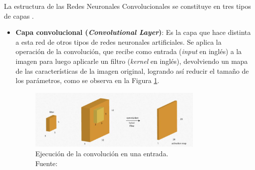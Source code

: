 \begin{itemize}
\begin{itemize}
		La estructura de las Redes Neuronales Convolucionales se constituye en tres tipos de capas \parencite{tec_lopez2016cnnTF}.
		\begin{itemize}
			\item \textbf{Capa convolucional (\textit{Convolutional Layer})}: Es la capa que hace distinta a esta red de otros tipos de redes neuronales artificiales. Se aplica la operación de la convolución, que recibe como entrada (\textit{input} en inglés) a la imagen para luego aplicarle un filtro (\textit{kernel} en inglés), devolviendo un mapa de las características de la imagen original, logrando así reducir el tamaño de los parámetros, como se observa en la Figura \ref{2:fig25}.
			\begin{figure}[h]
				\begin{center}
					\includegraphics[width=0.8\textwidth]{2/figures/convolucion.jpg}
					\caption[Ejecución de la convolución en una entrada]{Ejecución de la convolución en una entrada.\\
					Fuente: \cite{tec_lopez2016cnnTF}}
					\label{2:fig25}
				\end{center}
			\end{figure}
			

\end{itemize}
\end{itemize}
\end{itemize}
